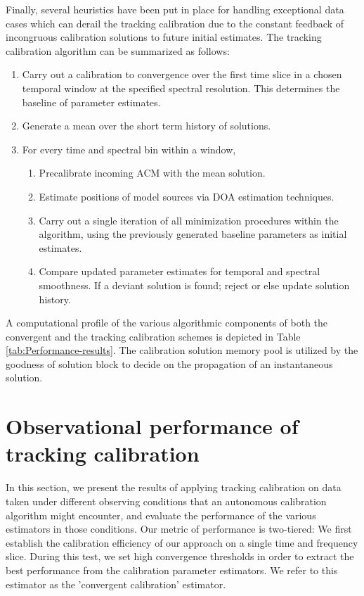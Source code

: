 \documentclass[referee]{aa}
\begin{document}
Finally, several heuristics have been put in place for handling exceptional data
cases which can derail the tracking  calibration due to the constant feedback of
incongruous  calibration solutions  to future  initial estimates.   The tracking
calibration algorithm can be summarized as follows:
\begin{enumerate}
\item Carry  out a  calibration to convergence  over the  first time slice  in a
  chosen temporal  window at the specified spectral  resolution. This determines
  the baseline of parameter estimates.
\item Generate a mean over the short term history of solutions.
\item For every time and spectral bin within a window,
  \begin{enumerate}
    \item Precalibrate incoming ACM with the mean solution.
    \item Estimate positions of model sources via DOA estimation techniques.
    \item Carry out a single iteration of all minimization procedures within the
      algorithm, using  the previously generated baseline  parameters as initial
      estimates.
    \item  Compare  updated  parameter   estimates  for  temporal  and  spectral
      smoothness.  If a deviant solution  is found; reject or else update solution
      history.
  \end{enumerate}
\end{enumerate}

A  computational profile  of  the  various algorithmic  components  of both  the
convergent  and   the  tracking  calibration   schemes  is  depicted   in  Table
\ref{tab:Performance-results}.  The calibration solution memory pool is utilized
by  the  goodness  of  solution  block  to  decide  on  the  propagation  of  an
instantaneous solution.

\section{\label{sec:Performance-of-tracking}Observational performance of tracking calibration}


In this section, we present the results of applying tracking calibration on data
taken  under  different  observing  conditions that  an  autonomous  calibration
algorithm  might  encounter,  and   evaluate  the  performance  of  the  various
estimators in  those conditions.   Our metric of  performance is  two-tiered: We
first establish the calibration efficiency of  our approach on a single time and
frequency slice. During  this test, we set high  convergence thresholds in order
to extract the  best performance from the calibration  parameter estimators.  We
refer to this estimator as the 'convergent calibration' estimator.
\end{document}
